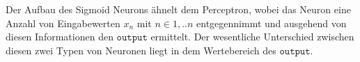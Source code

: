 \noindent
Der Aufbau des Sigmoid Neurons ähnelt dem Perceptron, wobei das Neuron eine Anzahl von Eingabewerten $x_n$ mit $n \in {1, .. n}$ entgegennimmt und ausgehend von diesen Informationen den $\mathtt{output}$ ermittelt. Der wesentliche Unterschied zwischen diesen zwei Typen von Neuronen liegt in dem Wertebereich des $\mathtt{output}$. 